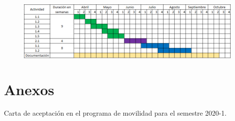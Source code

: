 \documentclass[11pt]{article}
\begin{document}
\vspace{2mm}

\begin{figure}[h]
    \centering
    \includegraphics[width=1\linewidth]{Cronograma.PNG}
\label{Cronograma}
\end{figure}





\section{ Anexos}

Carta de aceptación en el programa de movilidad para el semestre 2020-1.

\end{document}
